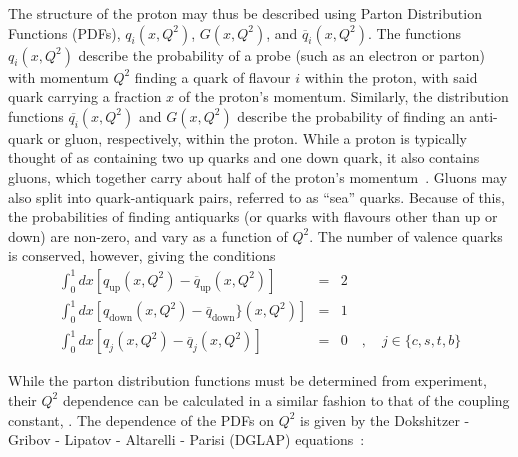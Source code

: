  The structure of the proton may thus be described using Parton Distribution Functions (PDFs), $q_i(x,Q^2)$, $G(x,Q^2)$, and $\overline{q}_i(x,Q^2)$. The functions $q_i(x,Q^2)$ describe the probability of a probe (such as an electron or parton) with momentum $Q^2$ finding a quark of flavour $i$ within the proton, with said quark carrying a fraction $x$ of the proton's momentum\cite{burgessSM}. Similarly, the distribution functions $\overline{q_i}(x,Q^2)$ and $G(x,Q^2)$ describe the probability of finding an anti-quark or gluon, respectively, within the proton. While a proton is typically thought of as containing two up quarks and one down quark, it also contains gluons, which together carry about half of the proton's momentum~\cite{burgessSM}. Gluons may also split into quark-antiquark pairs, referred to as ``sea'' quarks. Because of this, the probabilities of finding antiquarks (or quarks with flavours other than up or down) are non-zero, and vary as a function of $Q^2$\cite{greiner2007quantum}. The number of valence quarks is conserved, however, giving the conditions
\begin{eqnarray}
\int_0^1 dx \left[q_{\mathrm{up}} (x,Q^2) - \overline{q}_{\mathrm{up}}(x,Q^2)\right] & = & 2 \\
\int_0^1 dx \left[q_{\mathrm{down}} (x,Q^2) - \overline{q}_{\mathrm{down}}\}(x,Q^2)\right] & = & 1 \\
\int_0^1 dx \left[q_{j} (x,Q^2) - \overline{q}_{j}(x,Q^2)\right] & = & 0 \quad,\quad j \in \{c,s,t,b\}
\end{eqnarray}




While the parton distribution functions must be determined from experiment, their $Q^2$ dependence can be calculated in a similar fashion to that of the coupling constant, \alphas. The dependence of the PDFs on $Q^2$ is given by the Dokshitzer - Gribov - Lipatov - Altarelli - Parisi (DGLAP) equations~\cite{burgessSM,Altarelli1977298}:

